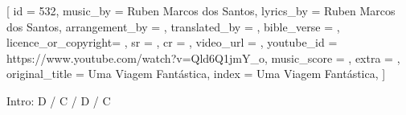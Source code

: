 [
    id                  = {532},
    music_by            = {Ruben Marcos dos Santos}, %
    lyrics_by           = {Ruben Marcos dos Santos}, %
    arrangement_by      = {}, %
    translated_by       = {}, %
    bible_verse         = {},
    licence_or_copyright= {},
    sr                  = {},
    cr                  = {},
    video_url           = {}, %
    youtube_id          = {https://www.youtube.com/watch?v=Qld6Q1jmY_o}, %
    music_score         = {}, %
    extra               = {},
    original_title      = {Uma Viagem Fantástica}, %
    index               = {Uma Viagem Fantástica},
]

\beginverse
Intro:
D / C / D / C
\endverse

\beginverse

